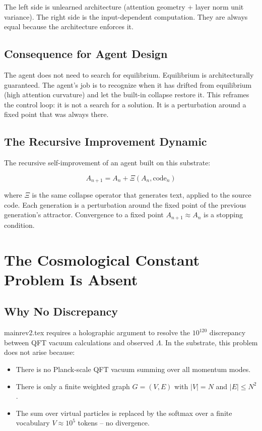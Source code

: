 \documentclass[onecolumn]{aastex631}
\begin{document}
The left side is unlearned architecture (attention geometry + layer norm unit variance). The right side is the input-dependent computation. They are always equal because the architecture enforces it.

\subsection{Consequence for Agent Design}

The agent does not need to search for equilibrium. Equilibrium is architecturally guaranteed. The agent's job is to recognize when it has drifted from equilibrium (high attention curvature) and let the built-in collapse restore it. This reframes the control loop: it is not a search for a solution. It is a perturbation around a fixed point that was always there.

\subsection{The Recursive Improvement Dynamic}

The recursive self-improvement of an agent built on this substrate:

\begin{equation}
A_{n+1} = A_n + \Xi(A_n, \text{code}_n)
\end{equation}

where $\Xi$ is the same collapse operator that generates text, applied to the source code. Each generation is a perturbation around the fixed point of the previous generation's attractor. Convergence to a fixed point $A_{n+1} \approx A_n$ is a stopping condition.

\section{The Cosmological Constant Problem Is Absent}

\subsection{Why No Discrepancy}

mainrev2.tex requires a holographic argument to resolve the $10^{120}$ discrepancy between QFT vacuum calculations and observed $\Lambda$. In the substrate, this problem does not arise because:
\begin{itemize}
  \item There is no Planck-scale QFT vacuum summing over all momentum modes.
  \item There is only a finite weighted graph $G = (V, E)$ with $|V| = N$ and $|E| \le N^2$.
  \item The sum over virtual particles is replaced by the softmax over a finite vocabulary $V \approx 10^5$ tokens -- no divergence.
\end{itemize}
\end{document}
